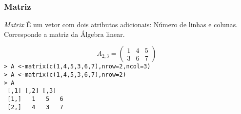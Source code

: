 \documentclass{beamer}
\begin{document}
  \begin{frame}
    \frametitle{Matriz}
    \begin{block}{\textit{Matrix}}
     É um vetor com dois atributos adicionais: Número de linhas e colunas. Corresponde a matriz da Álgebra linear. 
    \end{block}
\[A_{2,3}= \begin{pmatrix}
     1 &4 &5 \\
     3 & 6& 7
   \end{pmatrix} \]
\texttt{> A <-matrix(c(1,4,5,3,6,7),nrow=2,ncol=3)\\
> A <-matrix(c(1,4,5,3,6,7),nrow=2)\\
> A\\
  \hspace{20pt} ~[,1]~[,2]~[,3]\\
~[1,]  ~  1  ~  5 ~   6\\
~[2,]  ~  4 ~   3  ~  7
}
  \end{frame}
\end{document}
